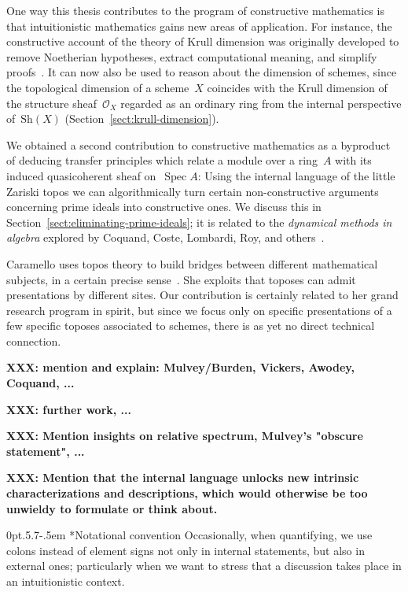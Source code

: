 \documentclass[10pt,reqno,a4paper]{amsbook}
\makeatletter
\theoremstyle{definition}
\theoremstyle{plain}
\theoremstyle{remark}
\renewcommand{\O}{\mathcal{O}}
\newcommand{\Sh}{\mathrm{Sh}}
\DeclareMathOperator{\Spec}{Spec}
\newcommand{\?}{\,{:}\,}
\renewcommand{\_}{\mathpunct{.}\,}
\newcommand{\XXX}[1]{\textbf{XXX: #1}}
\def\subsection{\@startsection{subsection}{2}%
  {0pt}{.5\linespacing\@plus.7\linespacing}{-.5em}%
  {\normalfont\bfseries}}
\makeatother
\begin{document}
{One way this thesis contributes to the program of constructive
mathematics is that intuitionistic mathematics gains new areas of application.
For instance, the constructive account of the theory of Krull dimension was
originally developed to remove Noetherian hypotheses, extract computational meaning, and
simplify proofs~\cite{dyn:krull-integral,dyn:char-krull}. It can now also be used to
reason about the dimension of schemes, since the topological dimension of a
scheme~$X$ coincides with the Krull dimension of the structure sheaf~$\O_X$
regarded as an ordinary ring from the internal perspective of~$\Sh(X)$
(Section~\ref{sect:krull-dimension}).

We obtained a second contribution to constructive mathematics as a byproduct of
deducing transfer principles which relate a module over a ring~$A$ with its
induced quasicoherent sheaf on~$\Spec A$: Using the internal language of the
little Zariski topos we can algorithmically turn certain non-constructive
arguments concerning prime ideals into constructive ones. We discuss this in
Section~\ref{sect:eliminating-prime-ideals}; it is related to the
\emph{dynamical methods in algebra} explored by Coquand, Coste, Lombardi, Roy,
and others~\cite{clr:dynamicalmethod,cl:logical}.

Caramello uses topos theory to build bridges between different mathematical
subjects, in a certain precise sense~\cite{caramello:1,caramello:2}. She
exploits that toposes can admit presentations by different sites. Our
contribution is certainly related to her grand research program in spirit, but since we
focus only on specific presentations of a few specific toposes associated to
schemes, there is as yet no direct technical connection.

\XXX{mention and explain: Mulvey/Burden, Vickers, Awodey, Coquand, ...}

\XXX{further work, ...}

\XXX{Mention insights on relative spectrum, Mulvey's "obscure statement", ...}

\XXX{Mention that the internal language unlocks new intrinsic
characterizations and descriptions, which would otherwise be too unwieldy to
formulate or think about.}


\subsection*{Notational convention} Occasionally, when quantifying, we use
colons instead of element signs not only in internal statements, but also in
external ones; particularly when we want to stress that a discussion takes place
in an intuitionistic context.

}
\end{document}
